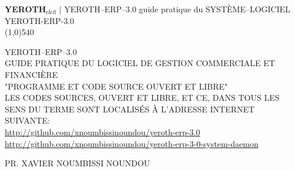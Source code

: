 \documentclass[a4paper, 12pt]{report}
\newcommand{\yerothrd}{\textcolor{yerothColorGreen}
			{\textsc{\textcolor{yerothColorRed}{YEROTH}}$_{\text{r\&d}}$\xspace}}
\newcommand{\yerotherpblack}{YEROTH--ERP--$3.0$\xspace}
\newcommand{\myfullacademicname}{PR. XAVIER NOUMBISSI NOUNDOU\xspace}
\begin{document}
\thispagestyle{OnlyFirstPage}

{\bf \Large \yerothrd} {| \sc \scriptsize \yerotherpblack guide pratique du SYSTÈME--LOGICIEL YEROTH-ERP-3.0}
\\ \line(1,0){540}

\vspace{2.0em}

\begin{center}
{\LARGE \yerotherpblack \\
\vspace{3em}
GUIDE PRATIQUE DU LOGICIEL DE GESTION COMMERCIALE ET FINANCI\`ERE \\
\vspace{4.0em}
"PROGRAMME ET CODE SOURCE OUVERT ET LIBRE"\\
\vspace{2.0em}
LES CODES SOURCES, OUVERT ET LIBRE, ET CE, DANS TOUS LES SENS DU TERME
SONT LOCALIS\'ES \`A L'ADRESSE INTERNET SUIVANTE:\\
\vspace{1.0em}
{\small \url{http://github.com/xnoumbissinoundou/yeroth-erp-3.0}}\\
{\small \url{http://github.com/xnoumbissinoundou/yeroth-erp-3-0-system-daemon}}
}
\end{center}

\vspace{4.0em}

\begin{center}
{\large \myfullacademicname}
\end{center}

\vspace{4.0em}



\begingroup
\tableofcontents
\endgroup

\begingroup
\color{medgreen}
\listoffigures
\endgroup

\begingroup
\color{medgreen}
\listoftables
\endgroup

\cleardoublepage







%
%

\cleardoublepage
{}
\printindex

\cleardoublepage
{}
{}

\appendix



\newpage


\end{document}
